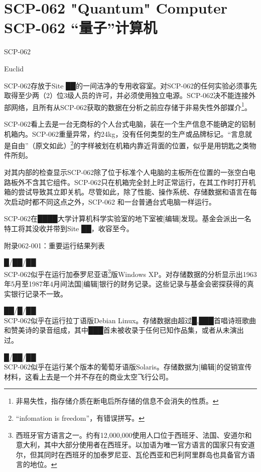 \chapter[SCP-062 “量子”计算机]{
    SCP-062 "Quantum" Computer\\
    SCP-062 “量子”计算机
}

\label{chap:SCP-062}

SCP-062

Euclid

SCP-062存放于Site ██的一间洁净的专用收容室。对SCP-062的任何实验必须事先取得至少两（2）位3级人员的许可，并必须使用独立电源。SCP-062决不能连接外部网络，且所有从SCP-062获取的数据在分析之前应存储于非易失性外部媒介\footnote{非易失性，指存储介质在断电后所存储的信息不会消失的性质。}。

SCP-062看上去是一台无商标的个人台式电脑，装在一个生产信息不能确定的铝制机箱内。SCP-062重量异常，约24kg，没有任何类型的生产或品牌标记。“言息就是自由”（原文如此）\footnote{“infomation is freedom”，有错误拼写。}的字样被划在机箱内靠近背面的位置，似乎是用钥匙之类物件所刻。

对其内部的检查显示SCP-062除了位于标准个人电脑的主板所在位置的一张空白电路板外不含其它组件。SCP-062只在机箱完全封上时正常运行，在其工作时打开机箱的尝试导致其立即关机。尽管如此，除了性能、操作系统、存储数据和语言在每次启动时都不同这点之外，SCP-062 和一台普通台式电脑一样运行。

SCP-062在████大学计算机科学实验室的地下室被{[}编辑]发现。基金会派出一名特工将其没收并带到Site ██，收容至今。

附录062-001：重要运行结果列表

█\slash ██\slash ██\\
SCP-062似乎在运行加泰罗尼亚语\footnote{西班牙官方语言之一。约有12,000,000使用人口位于西班牙、法国、安道尔和意大利，其中大部分使用者在西班牙。以加语为唯一官方语言的国家只有安道尔，但其同时在西班牙的加泰罗尼亚、瓦伦西亚和巴利阿里群岛也具备官方语言的地位。}版Windows XP。对存储数据的分析显示出1963年5月至1987年4月间法国{[}编辑]银行的财务记录。这些记录与基金会密探获得的真实银行记录不一致。

██\slash █\slash ██\\
SCP-062似乎在运行拉丁语版Debian Linux。存储数据由超过█,███首唱诗班歌曲和赞美诗的录音组成，其中███首未被收录于任何已知作品集，或者从未演出过。

█\slash ██\slash ██\\
SCP-062似乎在运行某个版本的葡萄牙语版Solaris。存储数据为{[}编辑]的促销宣传材料，这看上去是一个并不存在的商业太空飞行公司。

